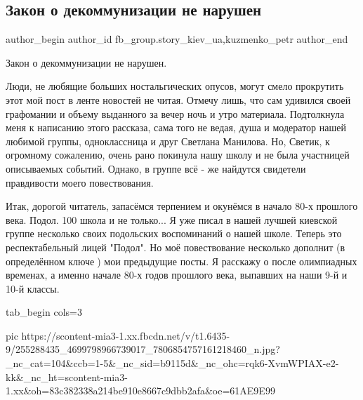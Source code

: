  
 
 
 
 
 
\subsection{Закон о декоммунизации не нарушен}
\label{sec:09_11_2021.fb.fb_group.story_kiev_ua.1.rasskaz_sssr_kiev}
 
\ifcmt
 author_begin
   author_id fb_group.story_kiev_ua,kuzmenko_petr
 author_end
\fi

Закон о декоммунизации не нарушен.

Люди, не любящие больших ностальгических опусов, могут смело прокрутить этот
мой пост в ленте новостей не читая. Отмечу лишь, что сам удивился своей
графомании и объему выданного за вечер ночь и утро материала. Подтолкнула меня
к написанию этого рассказа, сама того не ведая, душа и модератор нашей любимой
группы, одноклассница и друг Светлана Манилова. Но, Светик, к огромному
сожалению, очень рано покинула нашу школу и не была участницей описываемых
событий. Однако, в группе всё - же найдутся свидетели правдивости моего
повествования. 

Итак, дорогой читатель, запасёмся терпением и окунёмся в
начало 80-х прошлого века. Подол. 100 школа и не только...  Я уже писал в
нашей лучшей киевской группе несколько своих подольских воспоминаний о нашей
школе. Теперь это респектабельный лицей "Подол". Но моё повествование
несколько дополнит (в определённом ключе🤣) мои предыдущие посты. Я расскажу
о после олимпиадных временах, а именно начале 80-х годов прошлого века,
выпавших на наши 9-й и 10-й классы. 

\ifcmt
  tab_begin cols=3

     pic https://scontent-mia3-1.xx.fbcdn.net/v/t1.6435-9/255288435_4699798966739017_7806854757161218460_n.jpg?_nc_cat=104&ccb=1-5&_nc_sid=b9115d&_nc_ohc=rqk6-XvmWPIAX-e2-kk&_nc_ht=scontent-mia3-1.xx&oh=83c382338a214be910e8667c9dbb2afa&oe=61AE9E99

